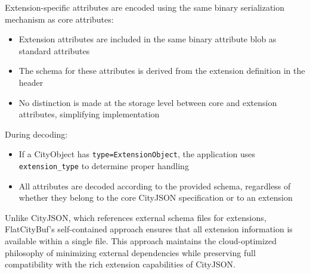 Extension-specific attributes are encoded using the same binary serialization mechanism as core attributes:

\begin{itemize}
  \item Extension attributes are included in the same binary attribute blob as standard attributes
  \item The schema for these attributes is derived from the extension definition in the header
  \item No distinction is made at the storage level between core and extension attributes, simplifying implementation
\end{itemize}

During decoding:
\begin{itemize}
  \item If a CityObject has \texttt{type=ExtensionObject}, the application uses \texttt{extension\_type} to determine proper handling
  \item All attributes are decoded according to the provided schema, regardless of whether they belong to the core CityJSON specification or to an extension
\end{itemize}

Unlike CityJSON, which references external schema files for extensions, FlatCityBuf's self-contained approach ensures that all extension information is available within a single file. This approach maintains the cloud-optimized philosophy of minimizing external dependencies while preserving full compatibility with the rich extension capabilities of CityJSON.
